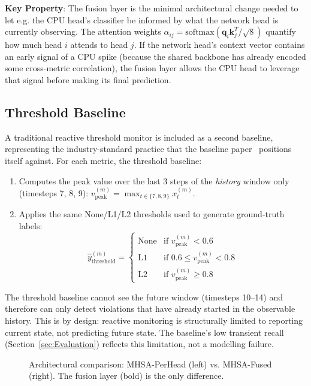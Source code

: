 \textbf{Key Property}: The fusion layer is the minimal architectural change needed to let e.g. the CPU head's classifier be informed by what the network head is currently observing. The attention weights $\alpha_{ij} = \text{softmax}(\mathbf{q}_i \mathbf{k}_j^T / \sqrt{8})$ quantify how much head $i$ attends to head $j$. If the network head's context vector contains an early signal of a CPU spike (because the shared backbone has already encoded some cross-metric correlation), the fusion layer allows the CPU head to leverage that signal before making its final prediction.

\subsection{Threshold Baseline}
\label{subsec:threshold}

A traditional reactive threshold monitor is included as a second baseline, representing the industry-standard practice that the baseline paper~\cite{Thapliyal26} positions itself against. For each metric, the threshold baseline:
\begin{enumerate}
  \item Computes the peak value over the last 3 steps of the \emph{history} window only (timesteps 7, 8, 9): $v_{\text{peak}}^{(m)} = \max_{t \in \{7, 8, 9\}} x_t^{(m)}$.
  \item Applies the same None/L1/L2 thresholds used to generate ground-truth labels:
  \begin{equation}
  \hat{y}_{\text{threshold}}^{(m)} = \begin{cases}
  \text{None} & \text{if } v_{\text{peak}}^{(m)} < 0.6 \\
  \text{L1} & \text{if } 0.6 \leq v_{\text{peak}}^{(m)} < 0.8 \\
  \text{L2} & \text{if } v_{\text{peak}}^{(m)} \geq 0.8
  \end{cases}
  \end{equation}
\end{enumerate}

The threshold baseline cannot see the future window (timesteps 10--14) and therefore can only detect violations that have already started in the observable history. This is by design: reactive monitoring is structurally limited to reporting current state, not predicting future state. The baseline's low transient recall (Section~\ref{sec:Evaluation}) reflects this limitation, not a modelling failure.

\begin{figure}[htp]
\centering
{}
\caption{Architectural comparison: MHSA-PerHead (left) vs. MHSA-Fused (right). The fusion layer (bold) is the only difference.}
\label{fig:architecture}
\end{figure}

